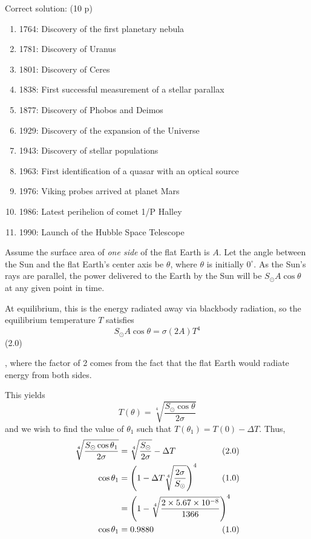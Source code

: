 Correct solution: \hfill(10 p)

\begin{enumerate}
\item 1764: Discovery of the first planetary nebula
\item 1781: Discovery of Uranus
\item 1801: Discovery of Ceres
\item 1838: First successful measurement of a stellar parallax
\item 1877: Discovery of Phobos and Deimos
\item 1929: Discovery of the expansion of the Universe
\item 1943: Discovery of stellar populations
\item 1963: First identification of a quasar with an optical source
\item 1976: Viking probes arrived at planet Mars
\item 1986: Latest perihelion of comet 1/P Halley
\item 1990: Launch of the Hubble Space Telescope
\end{enumerate}

Assume the surface area of \emph{one side} of the flat Earth is $A$. Let the angle between
the Sun and the flat Earth's center axis be $\theta$, where $\theta$ is initially $0^\circ$. As
the Sun's rays are parallel, the power delivered to the Earth by the Sun will be
$S_\odot A\cos\theta$ at any given point in time.

At equilibrium, this is the energy radiated away via blackbody radiation, so the equilibrium
temperature $T$ satisfies
\[
S_\odot A\cos\theta = \sigma(2A)T^4
\]
\hfill(2.0)

\noindent, where the factor of 2 comes from the fact that the flat Earth would radiate energy
from both sides.

This yields
\[
T(\theta) = \sqrt[4]{\frac{S_\odot\cos\theta}{2\sigma}}
\]
and we wish to find the value of $\theta_1$ such that $T(\theta_1) = T(0) - \Delta T$.
Thus,
\begin{align*}
\sqrt[4]{\frac{S_\odot\cos\theta_1}{2\sigma}} &= \sqrt[4]{\frac{S_\odot}{2\sigma}} - \Delta T
  & &\hspace{-2em}(2.0)\\
\cos\theta_1 &= \left(1 - \Delta T\sqrt[4]{\frac{2\sigma}{S_\odot}}\right)^4
  & &\hspace{-2em}(1.0)\\
 &= \left(1 - \sqrt[4]{\frac{2\times5.67\times10^{-8}}{1366}}\right)^4\\
\cos\theta_1 &= 0.9880
  & &\hspace{-2em}(1.0)
\end{align*}

